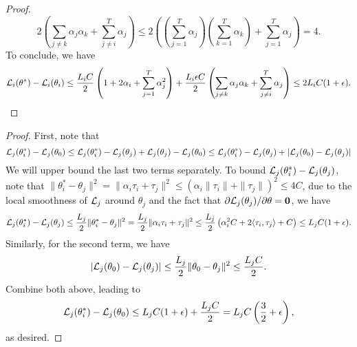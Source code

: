 \begin{proof}
\begin{equation*}
    2\left(\sum_{j\neq k}\alpha_j\alpha_k+\sum\limits_{j\neq i}^T\alpha_j\right) \leq 2\left(\left(\sum_{j=1}^T\alpha_j\right)\left(\sum_{k=1}^T\alpha_k\right)+\sum\limits_{j =1}^T\alpha_j\right) = 4.
\end{equation*}
To conclude, we have 
\begin{equation*}
           {\mathcal{L}}_i(\theta^*) - \mathcal{L}_i(\theta_i) \leq \frac{L_iC}{2}  \left(1+2\alpha_i+\sum\limits_{j=1}^T\alpha_j^2\right) + \frac{L_i \epsilon C}{2}\left(\sum_{j\neq k}\alpha_j\alpha_k+\sum\limits_{j\neq i}^T\alpha_j\right) \leq 2L_i C(1 + \epsilon).\qedhere
\end{equation*}
\end{proof}


\negate*
\begin{proof}
First, note that 
\begin{equation*}
    {\mathcal{L}}_j(\theta_i^*) - {\mathcal{L}}_j(\theta_0) \leq {\mathcal{L}}_j(\theta_i^*) - {\mathcal{L}}_j(\theta_j) + {\mathcal{L}}_j(\theta_j)- {\mathcal{L}}_j(\theta_0) \leq {\mathcal{L}}_j(\theta_i^*) - {\mathcal{L}}_j(\theta_j) + |{\mathcal{L}}_j(\theta_0) - {\mathcal{L}}_j(\theta_j)|
\end{equation*}
We will upper bound the last two terms separately. To bound ${\mathcal{L}}_j(\theta_i^*) - {\mathcal{L}}_j(\theta_j)$, note that $\|\theta_i^* - \theta_j\|^2 = \|\alpha_i\tau_i + \tau_j\|^2 \leq \left(\alpha_i \|\tau_i\| + \|\tau_j\|\right)^2 \leq 4C$, due to the local smoothness of ${\mathcal{L}}_j$ around $\theta_j$ and the fact that $\partial{\mathcal{L}}_j(\theta_j)/\partial \theta = \mathbf{0}$, we have
\begin{equation*}
    {\mathcal{L}}_j(\theta_i^*) - {\mathcal{L}}_j(\theta_j) \leq \frac{L_j}{2}\|\theta_i^* - \theta_j\|^2 = \frac{L_j}{2}\|\alpha_i \tau_i + \tau_j\|^2\leq \frac{L_j}{2}\left(\alpha_i^2 C + 2\langle \tau_i,\tau_j\rangle + C\right) \leq L_j C (1 + \epsilon).
\end{equation*}
Similarly, for the second term, we have 
\begin{equation*}
    |{\mathcal{L}}_j(\theta_0) - {\mathcal{L}}_j(\theta_j)| \leq \frac{L_j}{2}\|\theta_0 - \theta_j\|^2 \leq \frac{L_jC}{2}.
\end{equation*}
Combine both above, leading to
\begin{equation*}
    {\mathcal{L}}_j(\theta_i^*) - {\mathcal{L}}_j(\theta_0)  \leq L_j C (1 + \epsilon) + \frac{L_jC}{2} = L_jC \left(\frac{3}{2} + \epsilon\right),
\end{equation*}
as desired.
\end{proof}

